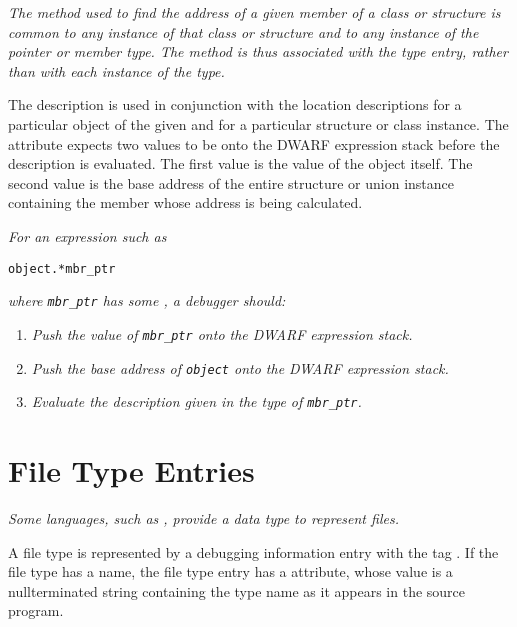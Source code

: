 \textit{The method used to find the address of a given member of a
class or structure is common to any instance of that class
or structure and to any instance of the pointer or member
type. The method is thus associated with the type entry,
rather than with each instance of the type.}

The \DWATuselocation{} description is used in conjunction
with the location descriptions for a particular object of the
given  and for a particular structure or
class instance. The \DWATuselocation{} 
attribute expects two values to be 
onto the DWARF expression stack before
the \DWATuselocation{} description is evaluated.
The first value 
is the value of the  object
itself. The second value 
is the base address of the
entire structure or union instance containing the member
whose address is being calculated.

\textit{For an expression such as}

\begin{lstlisting}[numbers=none]
    object.*mbr_ptr
\end{lstlisting}
\textit{where \texttt{mbr\_ptr} has some , a debugger should:}
\begin{enumerate}[1. ]
\item \textit{Push the value of \texttt{mbr\_ptr} onto the DWARF expression stack.}
\item \textit{Push the base address of \texttt{object} onto the DWARF expression stack.}
\item \textit{Evaluate the \DWATuselocation{} description 
given in the type of \texttt{mbr\_ptr}.}
\end{enumerate}


\section{File Type Entries}
\label{chap:filetypeentries}

\textit{Some languages, such as , 
provide a data type to represent 
files.}

A file type is represented by a debugging information entry
with 
the tag
\DWTAGfiletypeTARG. 
If the file type has a name,
the file type entry has a \DWATname{} attribute,
whose value
is a null\dash terminated string containing the type name as it
appears in the source program.

